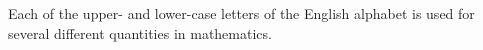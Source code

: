 Each of the upper- and lower-case letters of the English alphabet is used 
for several different quantities in mathematics.